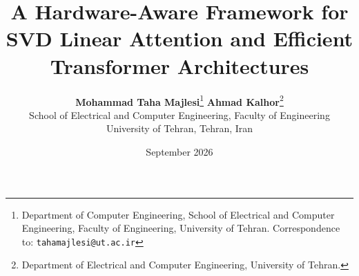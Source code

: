 \title{\textbf{A Hardware-Aware Framework for SVD Linear Attention and Efficient Transformer Architectures}}

\author{
  \textbf{Mohammad Taha Majlesi}\thanks{Department of Computer Engineering, School of Electrical and Computer Engineering, Faculty of Engineering, University of Tehran. Correspondence to: \texttt{tahamajlesi@ut.ac.ir}} \quad
  \textbf{Ahmad Kalhor}\thanks{Department of Electrical and Computer Engineering, University of Tehran.} \\
  School of Electrical and Computer Engineering, Faculty of Engineering \\
  University of Tehran, Tehran, Iran
}

\date{September 2026}
